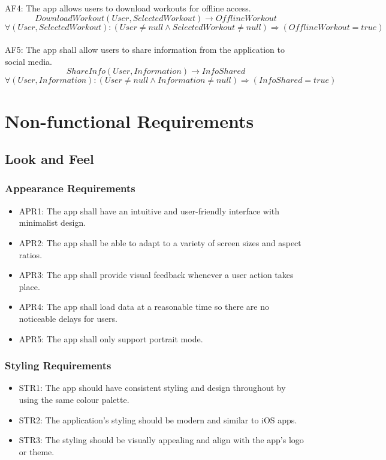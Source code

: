 \documentclass[12pt]{article}
\begin{document}
AF4: The app allows users to download workouts for offline access.
\[DownloadWorkout(User, SelectedWorkout) \rightarrow OfflineWorkout \]
\[ \forall (User, SelectedWorkout): (User \neq null \land SelectedWorkout \neq null) \Rightarrow (OfflineWorkout = true) \]\\

AF5: The app shall allow users to share information from the application to social media.
\[ShareInfo(User, Information) \rightarrow InfoShared \]
\[ \forall (User, Information): (User \neq null \land Information \neq null) \Rightarrow (InfoShared = true) \]

\section{Non-functional Requirements}

\subsection{Look and Feel}

\subsubsection{Appearance Requirements}
\begin{itemize}
\item APR1: The app shall have an intuitive and user-friendly interface with minimalist design.
\item APR2: The app shall be able to adapt to a variety of screen sizes and aspect ratios.
\item APR3: The app shall provide visual feedback whenever a user action takes place.
\item APR4: The app shall load data at a reasonable time so there are no noticeable delays for users.
\item APR5: The app shall only support portrait mode.
\end{itemize}

\subsubsection{Styling Requirements}
\begin{itemize}
\item STR1: The app should have consistent styling and design throughout by using the same colour palette.
\item STR2: The application’s styling should be modern and similar to iOS apps.
\item STR3: The styling should be visually appealing and align with the app’s logo or theme.
\end{itemize}
\end{document}
